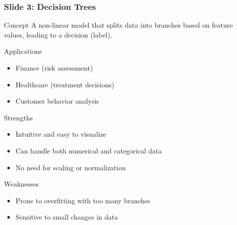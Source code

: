 \documentclass[aspectratio=169]{beamer}
\begin{document}
\begin{frame}[fragile]
    \frametitle{Slide 3: Decision Trees}
    \begin{block}{Concept}
        A non-linear model that splits data into branches based on feature values, leading to a decision (label).
    \end{block}
    \begin{block}{Applications}
        \begin{itemize}
            \item Finance (risk assessment)
            \item Healthcare (treatment decisions)
            \item Customer behavior analysis
        \end{itemize}
    \end{block}
    \begin{block}{Strengths}
        \begin{itemize}
            \item Intuitive and easy to visualize
            \item Can handle both numerical and categorical data
            \item No need for scaling or normalization
        \end{itemize}
    \end{block}
    \begin{block}{Weaknesses}
        \begin{itemize}
            \item Prone to overfitting with too many branches
            \item Sensitive to small changes in data
        \end{itemize}
    \end{block}
\end{frame}
\end{document}
